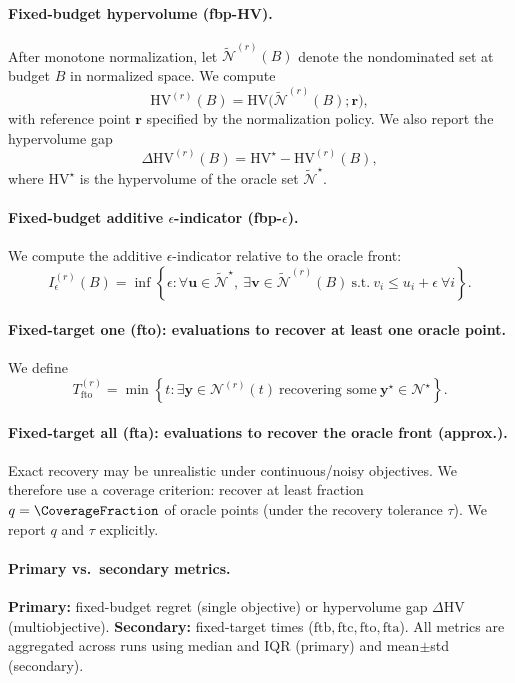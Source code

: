 \paragraph{Fixed-budget hypervolume (fbp-HV).}
After monotone normalization, let \(\tilde{\mathcal{N}}^{(r)}(B)\) denote the nondominated set at budget \(B\) in normalized space.
We compute
\begin{equation}
    \mathrm{HV}^{(r)}(B)
    = \mathrm{HV}\!\big(\tilde{\mathcal{N}}^{(r)}(B); \mathbf{r}\big),
\end{equation}
with reference point \(\mathbf{r}\) specified by the normalization policy.
We also report the hypervolume gap
\[
    \Delta \mathrm{HV}^{(r)}(B) = \mathrm{HV}^\star - \mathrm{HV}^{(r)}(B),
\]
where \(\mathrm{HV}^\star\) is the hypervolume of the oracle set \(\tilde{\mathcal{N}}^\star\).

\paragraph{Fixed-budget additive \(\epsilon\)-indicator (fbp-\(\epsilon\)).}
We compute the additive \(\epsilon\)-indicator relative to the oracle front:
\begin{equation}
    I_{\epsilon}^{(r)}(B) =
    \inf\left\{\epsilon :
    \forall \mathbf{u}\in\tilde{\mathcal{N}}^\star,\
    \exists \mathbf{v}\in\tilde{\mathcal{N}}^{(r)}(B)
    \ \text{s.t.}\ v_i \le u_i + \epsilon\ \forall i
    \right\}.
\end{equation}

\paragraph{Fixed-target one (fto): evaluations to recover at least one oracle point.}
We define
\begin{equation}
    T_{\mathrm{fto}}^{(r)} =
    \min\left\{t :
    \exists \mathbf{y}\in \mathcal{N}^{(r)}(t)\ \text{recovering some}\ \mathbf{y}^\star\in\mathcal{N}^\star
    \right\}.
\end{equation}

\paragraph{Fixed-target all (fta): evaluations to recover the oracle front (approx.).}
Exact recovery may be unrealistic under continuous/noisy objectives.
We therefore use a coverage criterion: recover at least fraction \(q=\CoverageFraction\) of oracle points
(under the recovery tolerance \(\tau\)). We report \(q\) and \(\tau\) explicitly.

\paragraph{Primary vs.\ secondary metrics.}
\textbf{Primary:} fixed-budget regret (single objective) or hypervolume gap \(\Delta\mathrm{HV}\) (multiobjective).
\textbf{Secondary:} fixed-target times (\(\mathrm{ftb}, \mathrm{ftc}, \mathrm{fto}, \mathrm{fta}\)).
All metrics are aggregated across runs using median and IQR (primary) and mean$\pm$std (secondary).
